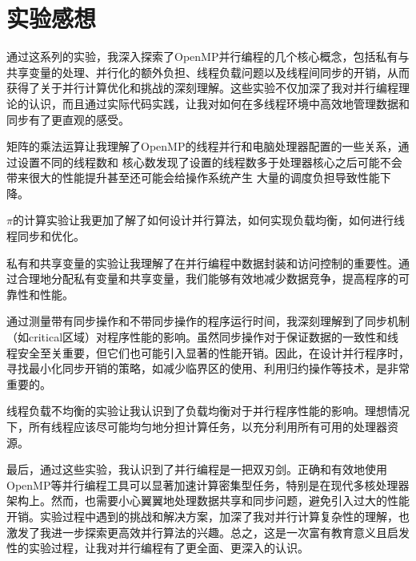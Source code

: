 \documentclass{article}
\begin{document}
\section{实验感想}
通过这系列的实验，我深入探索了OpenMP并行编程的几个核心概念，包括私有与共享变量的处理、并行化的额外负担、线程负载问题以及线程间同步的开销，从而获得了关于并行计算优化和挑战的深刻理解。这些实验不仅加深了我对并行编程理论的认识，而且通过实际代码实践，让我对如何在多线程环境中高效地管理数据和同步有了更直观的感受。

矩阵的乘法运算让我理解了OpenMP的线程并行和电脑处理器配置的一些关系，通过设置不同的线程数和
核心数发现了设置的线程数多于处理器核心之后可能不会带来很大的性能提升甚至还可能会给操作系统产生
大量的调度负担导致性能下降。

$\pi$的计算实验让我更加了解了如何设计并行算法，如何实现负载均衡，如何进行线程同步和优化。

私有和共享变量的实验让我理解了在并行编程中数据封装和访问控制的重要性。通过合理地分配私有变量和共享变量，我们能够有效地减少数据竞争，提高程序的可靠性和性能。

通过测量带有同步操作和不带同步操作的程序运行时间，我深刻理解到了同步机制（如critical区域）对程序性能的影响。虽然同步操作对于保证数据的一致性和线程安全至关重要，但它们也可能引入显著的性能开销。因此，在设计并行程序时，寻找最小化同步开销的策略，如减少临界区的使用、利用归约操作等技术，是非常重要的。

线程负载不均衡的实验让我认识到了负载均衡对于并行程序性能的影响。理想情况下，所有线程应该尽可能均匀地分担计算任务，以充分利用所有可用的处理器资源。

最后，通过这些实验，我认识到了并行编程是一把双刃剑。正确和有效地使用OpenMP等并行编程工具可以显著加速计算密集型任务，特别是在现代多核处理器架构上。然而，也需要小心翼翼地处理数据共享和同步问题，避免引入过大的性能开销。实验过程中遇到的挑战和解决方案，加深了我对并行计算复杂性的理解，也激发了我进一步探索更高效并行算法的兴趣。总之，这是一次富有教育意义且启发性的实验过程，让我对并行编程有了更全面、更深入的认识。
\newpage
\appendix
\end{document}
